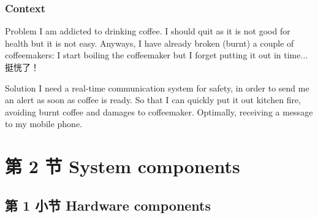 \documentclass[
    aspectratio=169,                   %
]{beamer}
\begin{document}
    \begin{frame}
        \frametitle{Context}

        \begin{block}{Problem}
            I am addicted to drinking coffee. I should quit as it is not good for health but it is not easy. Anyways, I have already broken (burnt) a couple of coffeemakers: I start boiling the coffeemaker but I forget putting it out in time... 挺恍了！
        \end{block}

        \begin{block}{Solution}
            I need a real-time communication system for safety, in order to send me an alert as soon as coffee is ready. So that I can quickly put it out kitchen fire, avoiding burnt coffee and damages to coffeemaker. Optimally, receiving a message to my mobile phone.
        \end{block}

    \end{frame}

\section{第 2 节 System components}

\subsection{第 1 小节 Hardware components}
\end{document}
